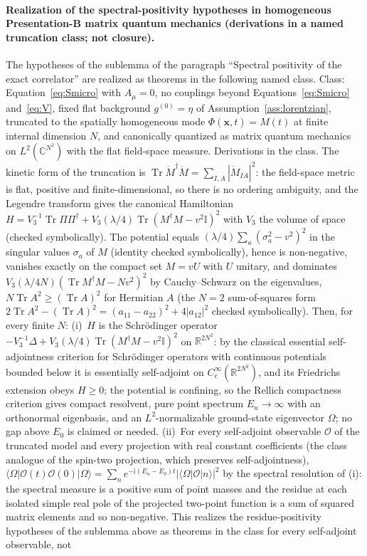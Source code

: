 \paragraph{Realization of the spectral-positivity hypotheses in homogeneous Presentation-B matrix quantum mechanics (derivations in a named truncation class; not closure).} The hypotheses of the sublemma of the paragraph ``Spectral positivity of the exact correlator'' are realized as theorems in the following named class. Class: Equation~\eqref{eq:Smicro} with \(A_\mu=0\), no couplings beyond Equations~\eqref{eq:Smicro} and~\eqref{eq:V}, fixed flat background \(g^{(0)}=\eta\) of Assumption~\ref{ass:lorentzian}, truncated to the spatially homogeneous mode \(\Phi(\mathbf x,t)=M(t)\) at finite internal dimension \(N\), and canonically quantized as matrix quantum mechanics on \(L^2(\mathbb C^{N^2})\) with the flat field-space measure. Derivations in the class. The kinetic form of the truncation is \(\operatorname{Tr}\dot M^\dagger\dot M=\sum_{I,A}|\dot M_{IA}|^2\): the field-space metric is flat, positive and finite-dimensional, so there is no ordering ambiguity, and the Legendre transform gives the canonical Hamiltonian \(H=V_3^{-1}\operatorname{Tr}\Pi\Pi^\dagger+V_3(\lambda/4)\operatorname{Tr}(M^\dagger M-v^2\mathbb I)^2\) with \(V_3\) the volume of space (checked symbolically). The potential equals \((\lambda/4)\sum_a(\sigma_a^2-v^2)^2\) in the singular values \(\sigma_a\) of \(M\) (identity checked symbolically), hence is non-negative, vanishes exactly on the compact set \(M=vU\) with \(U\) unitary, and dominates \(V_3(\lambda/4N)(\operatorname{Tr}M^\dagger M-Nv^2)^2\) by Cauchy--Schwarz on the eigenvalues, \(N\operatorname{Tr}A^2\ge(\operatorname{Tr}A)^2\) for Hermitian \(A\) (the \(N=2\) sum-of-squares form \(2\operatorname{Tr}A^2-(\operatorname{Tr}A)^2=(a_{11}-a_{22})^2+4|a_{12}|^2\) checked symbolically). Then, for every finite \(N\): (i)~\(H\) is the Schr\"odinger operator \(-V_3^{-1}\Delta+V_3(\lambda/4)\operatorname{Tr}(M^\dagger M-v^2\mathbb I)^2\) on \(\mathbb R^{2N^2}\): by the classical essential self-adjointness criterion for Schr\"odinger operators with continuous potentials bounded below it is essentially self-adjoint on \(C_c^\infty(\mathbb R^{2N^2})\), and its Friedrichs extension obeys \(H\ge0\); the potential is confining, so the Rellich compactness criterion gives compact resolvent, pure point spectrum \(E_n\to\infty\) with an orthonormal eigenbasis, and an \(L^2\)-normalizable ground-state eigenvector \(\Omega\); no gap above \(E_0\) is claimed or needed. (ii)~For every self-adjoint observable \(\mathcal O\) of the truncated model and every projection with real constant coefficients (the class analogue of the spin-two projection, which preserves self-adjointness), \(\langle\Omega|\mathcal O(t)\mathcal O(0)|\Omega\rangle=\sum_ne^{-\mathrm i(E_n-E_0)t}|\langle\Omega|\mathcal O|n\rangle|^2\) by the spectral resolution of (i): the spectral measure is a positive sum of point masses and the residue at each isolated simple real pole of the projected two-point function is a sum of squared matrix elements and so non-negative. This realizes the residue-positivity hypotheses of the sublemma above as theorems in the class for every self-adjoint observable, not 